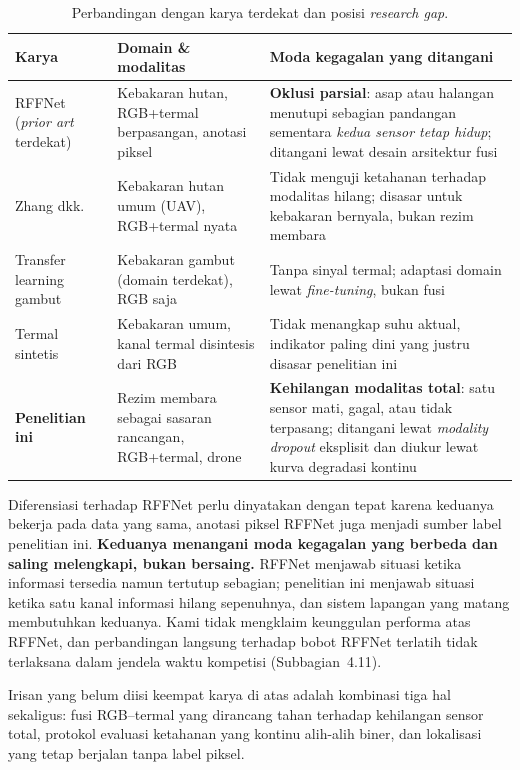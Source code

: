\begin{table}[!htbp]
\caption{Perbandingan dengan karya terdekat dan posisi \emph{research gap}.}
\label{tab:related}
\centering
\small
\begin{tabular}{p{2.4cm}p{3.6cm}p{5.8cm}}
\hline
\textbf{Karya} & \textbf{Domain \& modalitas} & \textbf{Moda kegagalan yang ditangani} \\
\hline
RFFNet \cite{rffnet2026} \newline (\emph{prior art} terdekat) &
Kebakaran hutan, RGB+termal berpasangan, anotasi piksel &
\textbf{Oklusi parsial}: asap atau halangan menutupi sebagian pandangan
sementara \emph{kedua sensor tetap hidup}; ditangani lewat desain arsitektur
fusi \\
Zhang dkk.\ \cite{zhang2025} &
Kebakaran hutan umum (UAV), RGB+termal nyata &
Tidak menguji ketahanan terhadap modalitas hilang; disasar untuk kebakaran
bernyala, bukan rezim membara \\
Transfer learning gambut \cite{peat2026} &
Kebakaran gambut (domain terdekat), RGB saja &
Tanpa sinyal termal; adaptasi domain lewat \emph{fine-tuning}, bukan fusi \\
Termal sintetis \cite{synthetic2026} &
Kebakaran umum, kanal termal disintesis dari RGB &
Tidak menangkap suhu aktual, indikator paling dini yang justru disasar
penelitian ini \\
\hline
\textbf{Penelitian ini} &
Rezim membara sebagai sasaran rancangan, RGB+termal, drone &
\textbf{Kehilangan modalitas total}: satu sensor mati, gagal, atau tidak
terpasang; ditangani lewat \emph{modality dropout} eksplisit dan diukur lewat
kurva degradasi kontinu \\
\hline
\end{tabular}
\end{table}

Diferensiasi terhadap RFFNet perlu dinyatakan dengan tepat karena keduanya
bekerja pada data yang sama, anotasi piksel RFFNet juga menjadi sumber label
penelitian ini. \textbf{Keduanya menangani moda kegagalan yang berbeda dan
saling melengkapi, bukan bersaing.} RFFNet menjawab situasi ketika informasi
tersedia namun tertutup sebagian; penelitian ini menjawab situasi ketika satu
kanal informasi hilang sepenuhnya, dan sistem lapangan yang matang membutuhkan
keduanya. Kami tidak mengklaim keunggulan performa atas RFFNet, dan perbandingan
langsung terhadap bobot RFFNet terlatih tidak terlaksana dalam jendela waktu
kompetisi (Subbagian~4.11).

Irisan yang belum diisi keempat karya di atas adalah kombinasi tiga hal
sekaligus: fusi RGB--termal yang dirancang tahan terhadap kehilangan sensor
total, protokol evaluasi ketahanan yang kontinu alih-alih biner, dan lokalisasi
yang tetap berjalan tanpa label piksel.
